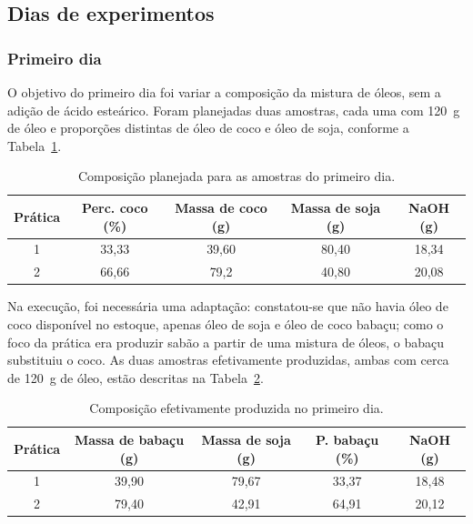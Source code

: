 \subsection{Dias de experimentos}

\subsubsection{Primeiro dia}

O objetivo do primeiro dia foi variar a composição da mistura de óleos, sem a adição de ácido esteárico. Foram planejadas duas amostras, cada uma com 120~g de óleo e proporções distintas de óleo de coco e óleo de soja, conforme a Tabela~\ref{tab:dia1_planejado}.

\begin{table}[H]
    \centering
    \footnotesize
    \caption{Composição planejada para as amostras do primeiro dia.}
    \label{tab:dia1_planejado}
    \begin{tabular}{ccccc}
        \toprule
        \textbf{Prática} & \textbf{Perc. coco (\%)} & \textbf{Massa de coco (g)} & \textbf{Massa de soja (g)} & \textbf{NaOH (g)} \\
        \midrule
        1 & 33,33 & 39,60 & 80,40 & 18,34  \\
        2 & 66,66 & 79,2 & 40,80 & 20,08 \\
        \bottomrule
    \end{tabular}
\end{table}

Na execução, foi necessária uma adaptação: constatou-se que não havia óleo de coco disponível no estoque, apenas óleo de soja e óleo de coco babaçu; como o foco da prática era produzir sabão a partir de uma mistura de óleos, o babaçu substituiu o coco. As duas amostras efetivamente produzidas, ambas com cerca de 120~g de óleo, estão descritas na Tabela~\ref{tab:dia1_efetuado}.

\begin{table}[H]
    \centering
    \footnotesize
    \caption{Composição efetivamente produzida no primeiro dia.}
    \label{tab:dia1_efetuado}
    \begin{tabular}{ccccc}
        \toprule
        \textbf{Prática} & \textbf{Massa de babaçu (g)} & \textbf{Massa de soja (g)} & \textbf{P. babaçu (\%)} & \textbf{NaOH (g)} \\
        \midrule
        1 & 39,90 & 79,67 & 33,37 & 18,48 \\
        2 & 79,40 & 42,91 & 64,91 & 20,12 \\
        \bottomrule
    \end{tabular}
\end{table}

